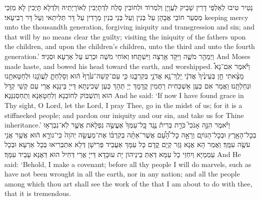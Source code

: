 {נָטֵיר טִיבוּ לְאַלְפֵי דָרִין שָׁבֵיק לַעֲוָיָן וְלִמְרוֹד וּלְחוֹבִין סָלַח לִדְתָּיְבִין לְאוֹרָיְתֵיהּ וְלִדְלָא תָּיְבִין לָא מְזַכֵּי מַסְעַר חוֹבֵי אֲבָהָן עַל בְּנִין וְעַל בְּנֵי בְנִין מָרָדִין עַל דָּר תְּלִיתַאי וְעַל דָּר רְבִיעָאי׃}
{keeping mercy unto the thousandth generation, forgiving iniquity and transgression and sin; and that will by no means clear the guilty; visiting the iniquity of the fathers upon the children, and upon the children’s children, unto the third and unto the fourth generation.’}{}
{וַיְמַהֵ֖ר מֹשֶׁ֑ה וַיִּקֹּ֥ד אַ֖רְצָה וַיִּשְׁתָּֽחוּ׃
}
{וְאוֹחִי מֹשֶׁה וּכְרַע עַל אַרְעָא וּסְגֵיד׃}
{And Moses made haste, and bowed his head toward the earth, and worshipped.}{}
{וַיֹּ֡אמֶר אִם־נָא֩ מָצָ֨אתִי חֵ֤ן בְּעֵינֶ֙יךָ֙ אֲדֹנָ֔י יֵֽלֶךְ־נָ֥א אֲדֹנָ֖י בְּקִרְבֵּ֑נוּ כִּ֤י עַם־קְשֵׁה־עֹ֙רֶף֙ ה֔וּא וְסָלַחְתָּ֛ לַעֲוֺנֵ֥נוּ וּלְחַטָּאתֵ֖נוּ וּנְחַלְתָּֽנוּ׃
}
{וַאֲמַר אִם כְּעַן אַשְׁכַּחִית רַחֲמִין קֳדָמָךְ יְיָ תְּהָךְ כְּעַן שְׁכִינְתָא דַּייָ בֵּינַנָא אֲרֵי עַם קְשֵׁי קְדָל הוּא וְתִשְׁבּוֹק לְחוֹבַנָא וְלִחְטָאַנָא וְתַחְסְנִנַּנָא׃}
{And he said: ‘If now I have found grace in Thy sight, O Lord, let the Lord, I pray Thee, go in the midst of us; for it is a stiffnecked people; and pardon our iniquity and our sin, and take us for Thine inheritance.’}{}
{וַיֹּ֗אמֶר הִנֵּ֣ה אָנֹכִי֮ כֹּרֵ֣ת בְּרִית֒ נֶ֤גֶד כׇּֽל־עַמְּךָ֙ אֶעֱשֶׂ֣ה נִפְלָאֹ֔ת אֲשֶׁ֛ר לֹֽא־נִבְרְא֥וּ בְכׇל־הָאָ֖רֶץ וּבְכׇל־הַגּוֹיִ֑ם וְרָאָ֣ה כׇל־הָ֠עָ֠ם אֲשֶׁר־אַתָּ֨ה בְקִרְבּ֜וֹ אֶת־מַעֲשֵׂ֤ה יְהֹוָה֙ כִּֽי־נוֹרָ֣א ה֔וּא אֲשֶׁ֥ר אֲנִ֖י עֹשֶׂ֥ה עִמָּֽךְ׃
}
{וַאֲמַר הָא אֲנָא גָּזַר קְיָם קֳדָם כָּל עַמָּךְ אַעֲבֵיד פְּרִישָׁן דְּלָא אִתְבְּרִיאוּ בְּכָל אַרְעָא וּבְכָל עַמְמַיָּא וְיִחְזֵי כָל עַמָּא דְּאַתְּ בֵּינֵיהוֹן יָת עוּבָדָא דַּייָ אֲרֵי דְּחִיל הוּא דַּאֲנָא עָבֵיד עִמָּךְ׃}
{And He said: ‘Behold, I make a covenant; before all thy people I will do marvels, such as have not been wrought in all the earth, nor in any nation; and all the people among which thou art shall see the work of the \lord\space that I am about to do with thee, that it is tremendous.}{}
